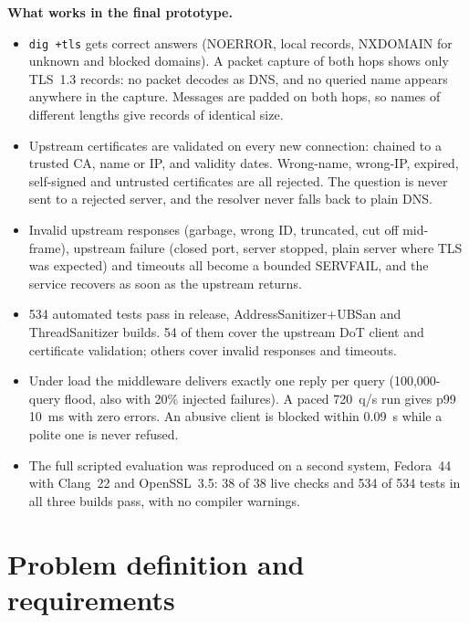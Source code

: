 \documentclass[11pt,a4paper]{article}
\newcommand{\code}[1]{\texttt{#1}}
\begin{document}
\textbf{What works in the final prototype.}
\begin{itemize}
  \item \code{dig +tls} gets correct answers (NOERROR, local records, NXDOMAIN for unknown and blocked domains). A
  packet capture of both hops shows only TLS~1.3 records: no packet decodes as DNS, and no queried name appears
  anywhere in the capture. Messages are padded on both hops, so names of different lengths give records of
  identical size.
  \item Upstream certificates are validated on every new connection: chained to a trusted CA, name or IP, and
  validity dates. Wrong-name, wrong-IP, expired, self-signed and untrusted certificates are all rejected. The
  question is never sent to a rejected server, and the resolver never falls back to plain DNS.
  \item Invalid upstream responses (garbage, wrong ID, truncated, cut off mid-frame), upstream failure (closed
  port, server stopped, plain server where TLS was expected) and timeouts all become a bounded SERVFAIL, and the
  service recovers as soon as the upstream returns.
  \item 534 automated tests pass in release, AddressSanitizer+UBSan and ThreadSanitizer builds. 54 of them
  cover the upstream DoT client and certificate validation; others cover invalid responses and timeouts.
  \item Under load the middleware delivers exactly one reply per query (100{,}000-query flood, also with 20\%
  injected failures). A paced 720~q/s run gives p99 10~ms with zero errors. An abusive client is blocked within
  0.09~s while a polite one is never refused.
  \item The full scripted evaluation was reproduced on a second system, Fedora~44 with Clang~22 and
  OpenSSL~3.5: 38 of 38 live checks and 534 of 534 tests in all three builds pass, with no compiler warnings.
\end{itemize}

\section{Problem definition and requirements}
\end{document}
